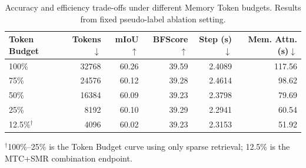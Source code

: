\begin{table}[t]
  \centering
  \small
  \setlength{\tabcolsep}{3pt}
  \renewcommand{\arraystretch}{1.08}
  \caption{Accuracy and efficiency trade-offs under different Memory Token budgets. Results from fixed pseudo-label ablation setting.}
  \label{tab:token_budget}
  \begin{tabular}{lrrrrr}
    \toprule
    Token Budget & Tokens$\downarrow$ & mIoU$\uparrow$ & BFScore$\uparrow$ & Step (s)$\downarrow$ & Mem. Attn. (s)$\downarrow$ \\
    \midrule
    100\% & 32768 & 60.26 & 39.59 & 2.4089 & 117.56 \\
    75\% & 24576 & 60.12 & 39.28 & 2.4614 & 98.62 \\
    50\% & 16384 & 60.09 & 39.23 & 2.3798 & 79.69 \\
    25\% & 8192 & 60.10 & 39.29 & 2.2941 & 60.54 \\
    12.5\%$^{\dagger}$ & 4096 & 60.02 & 39.23 & 2.3153 & 51.92 \\
    \bottomrule
  \end{tabular}

  \vspace{0.3em}
  \footnotesize{$^{\dagger}$100\%--25\% is the Token Budget curve using only sparse retrieval; 12.5\% is the MTC+SMR combination endpoint.}
\end{table}
